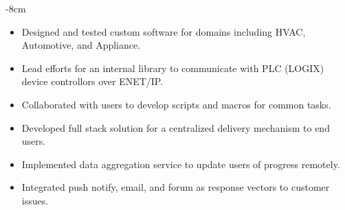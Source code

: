 \documentclass[10pt,a4paper]{altacv}
\begin{document}

\begin{adjustwidth}{}{-8cm}
\makecvheader
\end{adjustwidth}

\begin{itemize}
\item Designed and tested custom software for domains including HVAC, Automotive, and Appliance.
\item Lead efforts for an internal library to communicate with PLC (LOGIX) device controllors over ENET/IP.
\end{itemize}
\divider

\begin{itemize}
\item Collaborated with users to develop scripts and macros for common tasks. 
\item Developed full stack solution for a centralized delivery mechanism to end users.
\item Implemented data aggregation service to update users of progress remotely.
\item Integrated push notify, email, and forum as response vectors to customer issues. 
\end{itemize}
\end{document}
